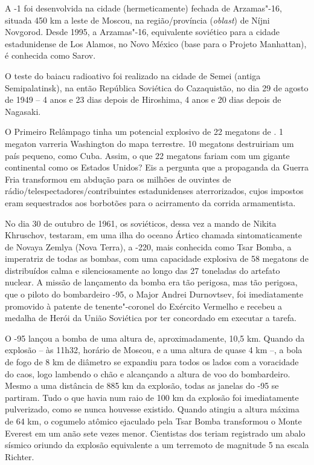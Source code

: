 A -1 foi desenvolvida na cidade (hermeticamente) fechada de
Arzamas"-16, situada 450 km a leste de Moscou, na região/província
(\emph{oblast}) de Níjni Novgorod. Desde 1995, a Arzamas"-16, equivalente
soviético para a cidade estadunidense de Los Alamos, no Novo México
(base para o Projeto Manhattan), é conhecida como Sarov.

O teste do baiacu radioativo foi realizado na cidade de Semei (antiga
Semipalatinsk), na então República Soviética do Cazaquistão, no dia 29
de agosto de 1949 -- 4 anos e 23 dias depois de Hiroshima, 4 anos e 20
dias depois de Nagasaki.

O Primeiro Relâmpago tinha um potencial explosivo de 22 megatons de .
1 megaton varreria Washington do mapa terrestre. 10 megatons destruiriam
um país pequeno, como Cuba. Assim, o que 22 megatons fariam com um
gigante continental como os Estados Unidos? Eis a pergunta que a
propaganda da Guerra Fria transformou em abdução para os milhões de
ouvintes de rádio/telespectadores/contribuintes estadunidenses
aterrorizados, cujos impostos eram sequestrados aos borbotões para o
acirramento da corrida armamentista.

No dia 30 de outubro de 1961, os soviéticos, dessa vez a mando de Nikita
Khruschov, testaram, em uma ilha do oceano Ártico chamada
sintomaticamente de Novaya Zemlya (Nova Terra), a -220, mais
conhecida como Tsar Bomba, a imperatriz de todas as bombas, com uma
capacidade explosiva de 58 megatons de  distribuídos calma e
silenciosamente ao longo das 27 toneladas do artefato nuclear. A missão
de lançamento da bomba era tão perigosa, mas tão perigosa, que o piloto
do bombardeiro -95, o Major Andrei Durnovtsev, foi imediatamente
promovido à patente de tenente"-coronel do Exército Vermelho e recebeu a
medalha de Herói da União Soviética por ter concordado em executar a
tarefa.

O -95 lançou a bomba de uma altura de, aproximadamente, 10,5 km.
Quando da explosão -- às 11h32, horário de Moscou, e a uma altura de
quase 4 km --, a bola de fogo de 8 km de diâmetro se expandiu para todos
os lados com a voracidade do caos, logo lambendo o chão e alcançando a
altura de voo do bombardeiro. Mesmo a uma distância de 885 km da
explosão, todas as janelas do -95 se partiram. Tudo o que havia num
raio de 100 km da explosão foi imediatamente pulverizado, como se nunca
houvesse existido. Quando atingiu a altura máxima de 64 km, o cogumelo
atômico ejaculado pela Tsar Bomba transformou o Monte Everest em um anão
sete vezes menor. Cientistas dos  teriam registrado um abalo sísmico
oriundo da explosão equivalente a um terremoto de magnitude 5 na escala
Richter.

